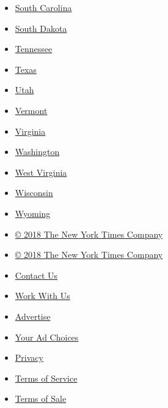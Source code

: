 \begin{itemize}
\item
  \href{https://www.nytimes3xbfgragh.onion/elections/results/south-carolina}{South
  Carolina}
\item
  \href{https://www.nytimes3xbfgragh.onion/elections/results/south-dakota}{South
  Dakota}
\item
  \href{https://www.nytimes3xbfgragh.onion/elections/results/tennessee}{Tennessee}
\item
  \href{https://www.nytimes3xbfgragh.onion/elections/results/texas}{Texas}
\item
  \href{https://www.nytimes3xbfgragh.onion/elections/results/utah}{Utah}
\item
  \href{https://www.nytimes3xbfgragh.onion/elections/results/vermont}{Vermont}
\item
  \href{https://www.nytimes3xbfgragh.onion/elections/results/virginia}{Virginia}
\item
  \href{https://www.nytimes3xbfgragh.onion/elections/results/washington}{Washington}
\item
  \href{https://www.nytimes3xbfgragh.onion/elections/results/west-virginia}{West
  Virginia}
\item
  \href{https://www.nytimes3xbfgragh.onion/elections/results/wisconsin}{Wisconsin}
\item
  \href{https://www.nytimes3xbfgragh.onion/elections/results/wyoming}{Wyoming}
\end{itemize}

\begin{itemize}
\tightlist
\item
  \href{http://www.nytco.com}{© 2018 The New York Times Company}
\end{itemize}

\begin{itemize}
\tightlist
\item
  \href{http://www.nytco.com}{© 2018 The New York Times Company}
\item
  \href{http://www.nytimes3xbfgragh.onion/ref/membercenter/help/infoservdirectory.html}{Contact
  Us}
\item
  \href{http://www.nytco.com/careers}{Work With Us}
\item
  \href{http://www.nytimes.whsites.net/mediakit}{Advertise}
\item
  \href{http://www.nytimes3xbfgragh.onion/content/help/rights/privacy/policy/privacy-policy.html\#pp}{Your
  Ad Choices}
\item
  \href{http://www.nytimes3xbfgragh.onion/privacy}{Privacy}
\item
  \href{http://www.nytimes3xbfgragh.onion/ref/membercenter/help/agree.html}{Terms
  of Service}
\item
  \href{http://www.nytimes3xbfgragh.onion/content/help/rights/sale/terms-of-sale.html}{Terms
  of Sale}
\end{itemize}


